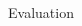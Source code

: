 \documentclass[final,hyperref={pdfpagelabels=false},professionalfonts,mathserif]{beamer}
\begin{document}
\begin{frame}[fragile]
\begin{columns}[t]
\begin{column}{.495\linewidth}
\begin{block}{\large Evaluation}
\begin{columns}[T]
\begin{column}{0.97\linewidth}

\end{column}
\end{columns}
\end{block}
\end{column}
\end{columns}
\end{frame}
\end{document}
